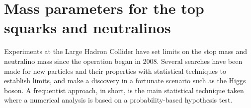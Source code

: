 


\section{Mass parameters for the top squarks and neutralinos}
Experiments at the Large Hadron Collider have set limits on the stop mass and neutralino mass since the operation began in 2008. Several searches have been made for new particles and their properties with statistical techniques to establish limits, and make a discovery in a fortunate scenario such as the Higgs boson. A frequentist approach, in short, is the main statistical technique taken where a numerical analysis is based on a probability-based hypothesis test.

